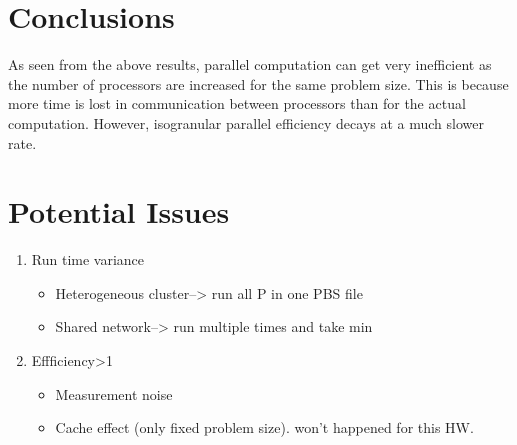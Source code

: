 \documentclass[11pt, oneside]{article}   	%
\begin{document}
\vspace{-2ex} \section{Conclusions}
As seen from the above results, parallel computation can get very inefficient as the number of processors are increased for the same problem size. This is because more time is lost in communication between processors than for the actual computation. However, isogranular parallel efficiency decays at a much slower rate.
\vspace{-2ex} \section{Potential Issues}
\begin{enumerate}
	\item Run time variance
	\begin{itemize}
		\item Heterogeneous cluster--> run all P in one PBS file
		\item Shared network--> run multiple times and take min
	\end{itemize}
	\item Effficiency>1
	\begin{itemize}
	\item Measurement noise
	\item Cache effect (only fixed problem size). won't happened for this HW.
	\end{itemize}
\end{enumerate}
\end{document}
